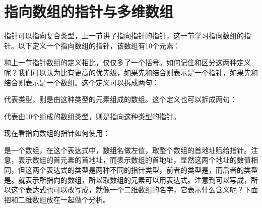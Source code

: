 



\section{指向数组的指针与多维数组}
%
指针可以指向复合类型，上一节讲了指向指针的指针，这一节学习指向数组的指针。以下定义一个指向数组的指针，该数组有10个元素：




和上一节指针数组的定义相比，仅仅多了一个\BookCode{(\BookSplit{})\BookSplit{}}括号。如何记住和区分这两种定义呢？我们可以认为\BookCode{[\BookSplit{}]\BookSplit{}}比\BookCode{*}有更高的优先级，如果先和\BookCode{*}结合则表示是一个指针，如果先和\BookCode{[\BookSplit{}]\BookSplit{}}结合则表示是一个数组。这个定义可以拆成两句：




代表类型，则是由这种类型的元素组成的数组。这个定义也可以拆成两句：




代表由10个组成的数组类型，则是指向这种类型的指针。



现在看指向数组的指针如何使用：




是一个数组，在这个表达式中，数组名做左值，取整个数组的首地址赋给指针。注意，表示数组的首元素的首地址，而表示数组的首地址，显然这两个地址的数值相同，但这两个表达式的类型是两种不同的指针类型，前者的类型是，而后者的类型是。就表示所指向的数组，所以取数组的元素可以用表达式。注意到可以写成，所以这个表达式也可以改写成，就像一个二维数组的名字，它表示什么含义呢？下面把和二维数组放在一起做个分析。



